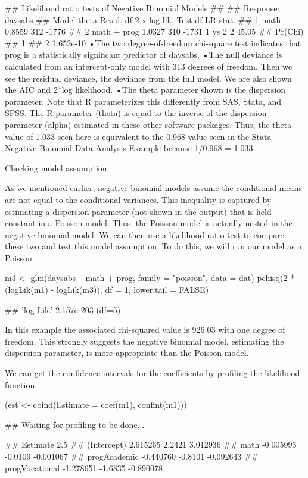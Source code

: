 ## Likelihood ratio tests of Negative Binomial Models
## 
## Response: daysabs
##         Model  theta Resid. df    2 x log-lik.   Test    df LR stat.
## 1        math 0.8559       312           -1776                      
## 2 math + prog 1.0327       310           -1731 1 vs 2     2    45.05
##     Pr(Chi)
## 1          
## 2 1.652e-10
•The two degree-of-freedom chi-square test indicates that prog is a statistically significant predictor of daysabs.
•The null deviance is calculated from an intercept-only model with 313 degrees of freedom. Then we see the residual deviance, the deviance from the full model. We are also shown the AIC and 2*log likelihood. 
•The theta parameter shown is the dispersion parameter. Note that R parameterizes this differently from SAS, Stata, and SPSS. The R parameter (theta) is equal to the inverse of the dispersion parameter (alpha) estimated in these other software packages. Thus, the theta value of 1.033 seen here is equivalent to the 0.968 value seen in the Stata Negative Binomial Data Analysis Example because 1/0.968 = 1.033. 

Checking model assumption

As we mentioned earlier, negative binomial models assume the conditional means are not equal to the conditional variances. This inequality is captured by estimating a dispersion parameter (not shown in the output) that is held constant in a Poisson model. Thus, the Poisson model is actually nested in the negative binomial model. We can then use a likelihood ratio test to compare these two and test this model assumption. To do this, we will run our model as a Poisson.



m3 <- glm(daysabs ~ math + prog, family = "poisson", data = dat)
pchisq(2 * (logLik(m1) - logLik(m3)), df = 1, lower.tail = FALSE)

## 'log Lik.' 2.157e-203 (df=5)

In this example the associated chi-squared value is 926.03 with one degree of freedom. This strongly suggests the negative binomial model, estimating the dispersion parameter, is more appropriate than the Poisson model.

We can get the confidence intervals for the coefficients by profiling the likelihood function.



(est <- cbind(Estimate = coef(m1), confint(m1)))

## Waiting for profiling to be done...

##                 Estimate   2.5 %
## (Intercept)     2.615265  2.2421  3.012936
## math           -0.005993 -0.0109 -0.001067
## progAcademic   -0.440760 -0.8101 -0.092643
## progVocational -1.278651 -1.6835 -0.890078

